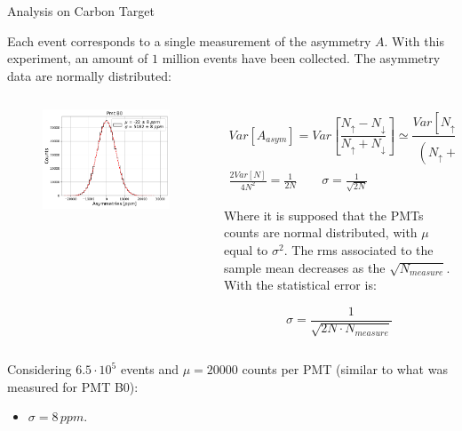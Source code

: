 \documentclass[9pt,a4paper]{beamer}
\begin{document}
\begin{frame}[t]{Analysis on Carbon Target}

Each event corresponds to a single measurement of the asymmetry $A$. With this experiment, an amount of $1$ million events have been collected. The asymmetry data are normally distributed:

\begin{columns}
\begin{column}{0.5\textwidth}
\begin{figure}
\includegraphics[width = \textwidth]{figures/B0.pdf}
\end{figure}
\end{column}
\begin{column}{0.5\textwidth}
\begin{gather*}
Var[A_{asym}] = Var[\dfrac{N_{\uparrow} - N_{\downarrow}}{ N_{\uparrow} + N_{\downarrow}}] \simeq \dfrac{Var[N_{\uparrow} - N_{\downarrow}]}{(N_{\uparrow} + N_{\downarrow})^{2}} \\
\frac{2Var[N]}{4N^{2}} = \frac{1}{2N} \qquad \sigma = \frac{1}{\sqrt{2N}}
\end{gather*}

Where it is supposed that the PMTs counts are normal distributed, with $\mu$ equal to $\sigma^{2}$. The rms associated to the sample mean decreases as the $\sqrt{N_{measure}}$. With the statistical error is:

\begin{equation}
\sigma = \dfrac{1}{\sqrt{2 N \cdot N_{measure}}} 
\end{equation}
\end{column}
\end{columns}

Considering $6.5\cdot 10^{5}$ events and $\mu = 20000$ counts per PMT (similar to what was measured for PMT B0):

\begin{itemize}
\centering
\item $\sigma = 8 \, ppm$.
\end{itemize}
\end{frame}
\end{document}
